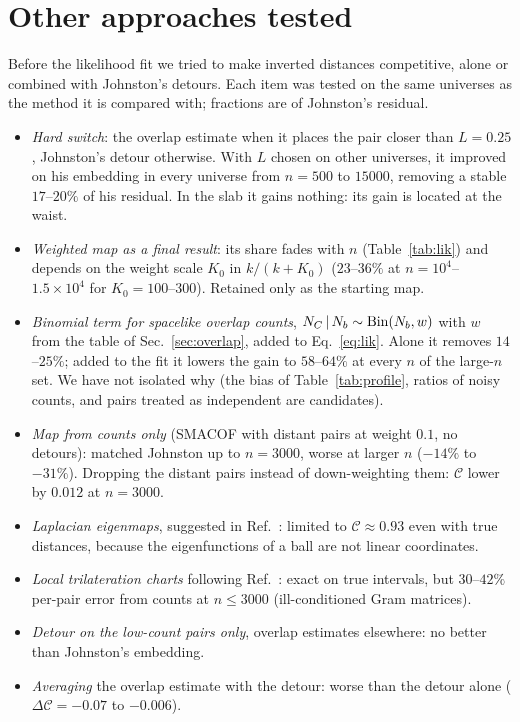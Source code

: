 \documentclass[prd,twocolumn,superscriptaddress,nofootinbib,amsmath,amssymb,floatfix]{revtex4-2}
\begin{document}
\section{Other approaches tested}\label{app:dropped}
Before the likelihood fit we tried to make inverted distances competitive, alone or combined with Johnston's detours. Each item was tested on the same universes as the method it is compared with; fractions are of Johnston's residual.
\begin{itemize}
\item \emph{Hard switch}: the overlap estimate when it places the pair closer than $L=0.25$, Johnston's detour otherwise. With $L$ chosen on other universes, it improved on his embedding in every universe from $n=500$ to $15000$, removing a stable $17$--$20\%$ of his residual. In the slab it gains nothing: its gain is located at the waist.
\item \emph{Weighted map as a final result}: its share fades with $n$ (Table~\ref{tab:lik}) and depends on the weight scale $K_0$ in $k/(k+K_0)$ ($23$--$36\%$ at $n=10^4$--$1.5\times10^4$ for $K_0=100$--$300$). Retained only as the starting map.
\item \emph{Binomial term for spacelike overlap counts}, $N_C\,|\,N_b\sim{\rm Bin}(N_b,w)$ with $w$ from the table of Sec.~\ref{sec:overlap}, added to Eq.~\eqref{eq:lik}. Alone it removes $14$--$25\%$; added to the fit it lowers the gain to $58$--$64\%$ at every $n$ of the large-$n$ set. We have not isolated why (the bias of Table~\ref{tab:profile}, ratios of noisy counts, and pairs treated as independent are candidates).
\item \emph{Map from counts only} (SMACOF with distant pairs at weight $0.1$, no detours): matched Johnston up to $n=3000$, worse at larger $n$ ($-14\%$ to $-31\%$). Dropping the distant pairs instead of down-weighting them: $\mathcal C$ lower by $0.012$ at $n=3000$.
\item \emph{Laplacian eigenmaps}, suggested in Ref.~\cite{BK24}: limited to $\mathcal C\approx0.93$ even with true distances, because the eigenfunctions of a ball are not linear coordinates.
\item \emph{Local trilateration charts} following Ref.~\cite{Madsen26}: exact on true intervals, but $30$--$42\%$ per-pair error from counts at $n\le3000$ (ill-conditioned Gram matrices).
\item \emph{Detour on the low-count pairs only}, overlap estimates elsewhere: no better than Johnston's embedding.
\item \emph{Averaging} the overlap estimate with the detour: worse than the detour alone ($\Delta\mathcal C=-0.07$ to $-0.006$).

\end{itemize}
\end{document}
